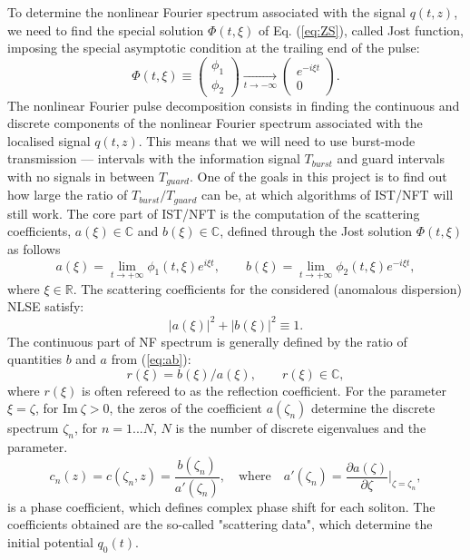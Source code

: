 To determine the nonlinear Fourier spectrum associated with the signal $q(t,z)$, we need to find the special solution $\Phi(t,\xi)$ of Eq. (\ref{eq:ZS}), called Jost function, imposing the special asymptotic condition at the trailing end of the pulse:
\begin{equation}
\Phi(t,\xi)\equiv\left(\begin{matrix}\phi_1\\ \phi_2\end{matrix}\right)
\xrightarrow[t\rightarrow-\infty]{} \left(\begin{matrix}e^{-i\xi t}\\ 0\end{matrix}\right).
\label{eq:asy}
\end{equation}
The nonlinear Fourier pulse decomposition consists in finding the continuous and discrete components of the nonlinear Fourier spectrum associated with the localised signal $q(t,z)$. This means that we will need to use burst-mode transmission --- intervals with the information signal $T_{burst}$ and guard intervals with no signals in between $T_{guard}$. One of the goals in this project is to find out how large the ratio of $T_{burst}/T_{guard}$ can be, at which algorithms of IST/NFT will still work. The core part of IST/NFT is the computation of the scattering coefficients, $a(\xi) \in \mathbb{C}$ and $b(\xi) \in \mathbb{C}$, defined through the Jost solution $\Phi(t,\xi)$ as follows
\begin{equation}
a(\xi)=\lim_{t\rightarrow+\infty}\phi_1(t,\xi) e^{i\xi t},
\qquad b(\xi)=\lim_{t \rightarrow+\infty}\phi_2(t,\xi) e^{-i\xi t},
\label{eq:ab}
\end{equation}
where $\xi \in \mathbb{R}$. The scattering coefficients for the considered (anomalous dispersion) NLSE satisfy:
\begin{equation}
|a(\xi)|^2 + |b(\xi)|^2 \equiv 1.
\label{eq:quad_inv}
\end{equation}
The continuous part of NF spectrum is generally defined by the ratio of quantities $b$ and $a$ from (\ref{eq:ab}):
\begin{equation}
\label{r}
r(\xi)=b(\xi)/a(\xi), \qquad r(\xi) \in \mathbb{C},
\end{equation}
where $r(\xi)$ is often refereed to as the reflection coefficient.
For the parameter $ \xi = \zeta $, for $ \mathrm{Im} \ \zeta> 0 $, the zeros of the coefficient $ a(\zeta_n) $ determine the discrete spectrum $ \zeta_n $, for $ n = 1... N $, $ N $ is the number of discrete eigenvalues and the parameter.
\begin{equation}
    c_n(z) = c(\zeta_n, z) = \frac{b(\zeta_n)}{a'(\zeta_n)} {,} \quad \text{where} \quad 
    a'(\zeta_n) = \frac{\partial a(\zeta)}{\partial \zeta}|_{\zeta = \zeta_n} {,}
    \label{eq:scat_sol}
\end{equation}
is a phase coefficient, which defines complex phase shift for each soliton.
The coefficients obtained are the so-called "scattering data", which determine the initial potential $q_0 (t)$.

